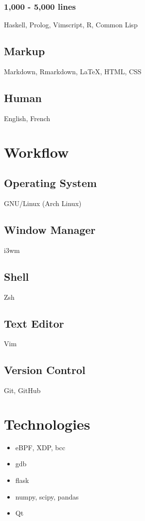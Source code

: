 \documentclass[
]{article}
\theoremstyle{plain}
\theoremstyle{remark}
\theoremstyle{definition}
\begin{document}
\begin{figure}
\begin{minipage}[t]{0.32\textwidth}
\subsubsection{1,000 - 5,000 lines}

Haskell, Prolog, Vimscript, R, Common Lisp

\subsection{Markup}

Markdown, Rmarkdown, \LaTeX, HTML, CSS

\subsection{Human}

English, French

\section{Workflow}

\subsection{Operating System}
GNU/Linux (Arch Linux)

\subsection{Window Manager}
i3wm

\subsection{Shell}
Zsh

\subsection{Text Editor}
Vim

\subsection{Version Control}
Git, GitHub

\section{Technologies}
\vspace{0.5em}
\begin{itemize}[itemsep=0em]
\item eBPF, XDP, bcc
\item gdb
\item flask
\item numpy, scipy, pandas
\item Qt
\end{itemize}


\end{minipage}
\end{figure}
\end{document}
